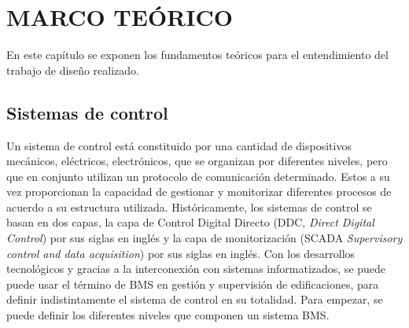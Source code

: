 \chapter{MARCO TEÓRICO}
\thispagestyle{empty}

\abovedisplayskip=0pt
\belowdisplayskip=10pt
\abovedisplayshortskip=0pt
\belowdisplayshortskip=10pt

En este capítulo se exponen los fundamentos teóricos para el entendimiento del trabajo de diseño realizado. 

\section{Sistemas de control}
Un sistema de control está constituido por una cantidad de dispositivos mecánicos, eléctricos, electrónicos, que se organizan por diferentes niveles, pero que en conjunto utilizan un protocolo de comunicación determinado. Estos a su vez proporcionan la capacidad de gestionar y monitorizar diferentes procesos de acuerdo a su estructura utilizada. Históricamente, los sistemas de control se basan en dos capas, la capa de Control Digital Directo (DDC, \textit{Direct Digital Control}) por sus siglas en inglés y la capa de monitorización (SCADA  \textit{Supervisory control and data acquisition}) por sus siglas en inglés\cite{FundamentosControl}. Con los desarrollos tecnológicos y gracias a la interconexión con sistemas informatizados, se puede puede usar el término de BMS en gestión y supervisión de edificaciones, para definir indistintamente el sistema de control en su totalidad. Para empezar, se puede definir los diferentes niveles que componen un sistema BMS.

